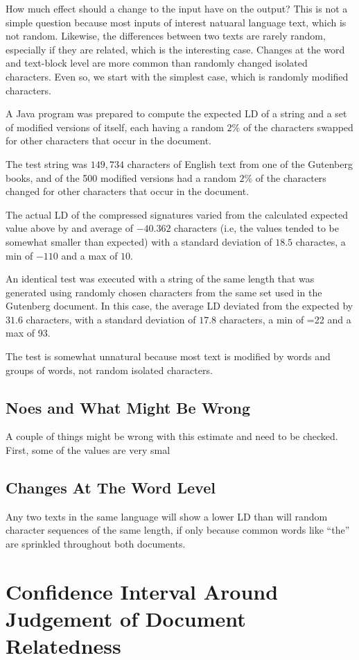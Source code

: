 \documentclass[html]{article}    %
\begin{document}
How much effect should a change to the input have on the output? This is not a simple question because
most inputs of interest natuaral language text, which is not random. 
Likewise, the differences between two texts are rarely random, especially if they are related, which is the 
interesting case. Changes at the word and text-block level are more common than randomly changed 
isolated characters. 
Even so, we start with the simplest case, which is randomly modified characters.

A Java program was prepared to compute the expected LD of a string and a set of modified versions 
of itself, each having a random $2\%$ of the characters swapped for other characters that occur in the document.

The test string was $149,734$ characters of English text from one of the Gutenberg books, and  
of the 500 modified versions had a random $2\%$ of the characters changed for other characters that occur in the document.

The actual LD of the compressed signatures varied from the calculated expected value above by and average
of $-40.362$ characters (i.e, the values tended to be somewhat smaller than expected) with a standard deviation of 
$18.5$ charactes, a min of $-110$ and a max of $10$.

An identical test was executed with a string of the same length that was generated using randomly chosen characters 
from the same set used in the Gutenberg document.
In this case, the average LD deviated from the expected by $31.6$ characters, 
with a standard deviation of $17.8$ characters, a min of =22 and a max of 93.

The test is somewhat unnatural because most text is modified by words and groups of words, not random isolated characters.

\subsection{Noes and What Might Be Wrong}
A couple of things might be wrong with this estimate and need to be checked. 
First, some of the values are very smal

\subsection{Changes At The Word Level}
Any two texts in the same language will show a lower LD than will random character sequences of the same length, if
only because common words like ``the'' are sprinkled throughout both documents.


\section{Confidence Interval Around Judgement of Document Relatedness}
\end{document}
